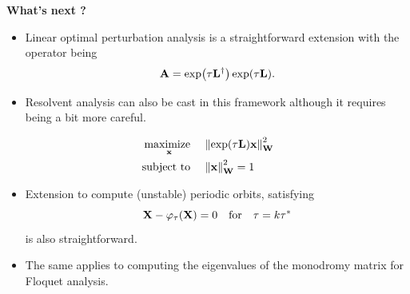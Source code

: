 \documentclass[aspectratio=169, usenames, dvipsnames]{beamer}
\DeclareMathOperator*{\maximize}{maximize~}
\DeclareMathOperator{\subto}{subject~to~}
\begin{document}
{\begin{frame}
\begin{minipage}{.48\textwidth}
    \end{minipage}
    \vfill
  \end{frame}
}


\begin{frame}
  \vfill
  \begin{minipage}{.48\textwidth}
  \end{minipage}%
  \hfill
  \begin{minipage}{.48\textwidth}
    \centering
    {
      \huge
      \textbf{What's next ?}
    }
  \end{minipage}
  \vfill
\end{frame}


\begin{frame}
  \vfill
  \begin{minipage}{.68\textwidth}
    \begin{itemize}
    \item Linear optimal perturbation analysis is a straightforward extension with the operator being
      \[
        \vb{A} = \exp(\tau \vb{L}^{\dagger}) \exp(\tau \vb{L}).
      \]

      \medskip
      
    \item Resolvent analysis can also be cast in this framework although it requires being a bit more careful.
    \end{itemize}
  \end{minipage}%
  \hfill
  \begin{minipage}{.28\textwidth}
    \[
      \begin{aligned}
        \maximize_{\vb{x}} & \quad \norm{\exp(\tau \vb{L}) \vb{x}}_{\vb{W}}^2 \\
        \subto & \quad \norm{\vb{x}}_{\vb{W}}^2 = 1
      \end{aligned}
    \]
  \end{minipage}
  \vfill
\end{frame}

\begin{frame}
  \vfill
  \begin{itemize}
  \item Extension to compute (unstable) periodic orbits, satisfying
    \[
      \vb{X} - \varphi_{\tau}(\vb{X}) = 0 \quad \text{for} \quad \tau = k \tau^*
    \]
    is also straightforward.

    \bigskip

  \item The same applies to computing the eigenvalues of the monodromy matrix for Floquet analysis.
  \end{itemize}
  \vfill
\end{frame}
\end{document}
